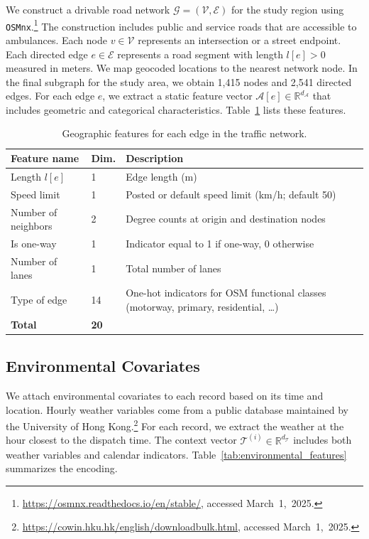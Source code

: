 \documentclass[11pt, letterpaper, oneside, reqno]{amsart}
\newcommand{\R}{\mathbb{R}}
\begin{document}
We construct a drivable road network $\mathcal G = (\mathcal V, \mathcal E)$ for the study region using \texttt{OSMnx}.\footnote{\url{https://osmnx.readthedocs.io/en/stable/}, accessed March~1,~2025.} The construction includes public and service roads that are accessible to ambulances. Each node $v \in \mathcal V$ represents an intersection or a street endpoint. Each directed edge $e \in \mathcal E$ represents a road segment with length $l[e] > 0$ measured in meters. We map geocoded locations to the nearest network node. 
In the final subgraph for the study area, we obtain 1{,}415 nodes and 2{,}541 directed edges. For each edge $e$, we extract a static feature vector $\mathcal A[e] \in \R^{d_{\mathcal A}}$ that includes geometric and categorical characteristics. Table~\ref{tab:edge_features} lists these features.

\begin{table}[h]
\centering
\small
\caption{Geographic features for each edge in the traffic network.}
\begin{tabularx}{\textwidth}{llX}
\hline
\textbf{Feature name} & \textbf{Dim.} & \textbf{Description} \\
\hline
Length $l[e]$ & 1 & Edge length (m) \\
Speed limit & 1 & Posted or default speed limit (km/h; default 50) \\
Number of neighbors & 2 & Degree counts at origin and destination nodes \\
Is one-way & 1 & Indicator equal to 1 if one-way, 0 otherwise \\
Number of lanes & 1 & Total number of lanes \\
Type of edge & 14 & One-hot indicators for OSM functional classes (motorway, primary, residential, \ldots) \\
\hline
\textbf{Total} & \textbf{20} & \\
\hline
\end{tabularx}
\label{tab:edge_features}
\end{table}

\subsection{Environmental Covariates}
\label{ec:environmental-covariates}

We attach environmental covariates to each record based on its time and location. Hourly weather variables come from a public database maintained by the University of Hong Kong.\footnote{\url{https://cowin.hku.hk/english/downloadbulk.html}, accessed March~1,~2025.} For each record, we extract the weather at the hour closest to the dispatch time. 
The context vector $\mathcal T^{(i)} \in \R^{d_{\mathcal T}}$ includes both weather variables and calendar indicators. Table~\ref{tab:environmental_features} summarizes the encoding.
\end{document}
